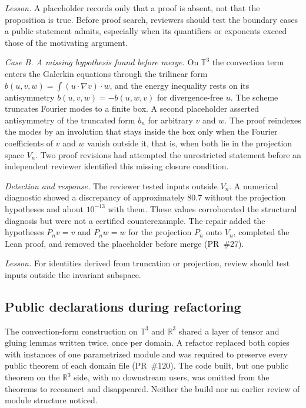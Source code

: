 \emph{Lesson.}
A placeholder records only that a proof is absent, not that the
proposition is true. Before proof search, reviewers should test the
boundary cases a public statement admits, especially when its quantifiers
or exponents exceed those of the motivating argument.

\emph{Case B. A missing hypothesis found before merge.}
On $\mathbb{T}^3$ the convection term enters the Galerkin equations
through the trilinear form $b(u,v,w) = \int (u\cdot\nabla v)\cdot w$, and
the energy inequality rests on its antisymmetry $b(u,v,w) = -b(u,w,v)$ for
divergence-free $u$. The scheme truncates Fourier modes to a finite box. A
second placeholder asserted antisymmetry of the truncated form $b_n$ for
arbitrary $v$ and $w$. The proof reindexes the
modes by an involution that stays inside the box only when the Fourier
coefficients of $v$ and $w$ vanish outside it, that is, when both lie in
the projection space $V_n$. Two proof revisions had attempted the
unrestricted statement before an independent reviewer identified this
missing closure condition. %

\emph{Detection and response.}
The reviewer tested inputs outside $V_n$. A numerical diagnostic showed a
discrepancy of approximately $80.7$ without the projection hypotheses and
about $10^{-13}$ with them. These values corroborated the structural
diagnosis but were not a certified counterexample. The repair added the hypotheses $P_n v = v$
and $P_n w = w$ for the projection $P_n$ onto $V_n$, completed the Lean
proof, and removed the placeholder before merge (PR~\#27).

\emph{Lesson.}
For identities derived from truncation or projection, review should test
inputs outside the invariant subspace. %

\subsection{Public declarations during refactoring}

The convection-form construction on $\mathbb{T}^3$ and $\mathbb{R}^3$
shared a layer of tensor and gluing lemmas written twice, once per domain.
A refactor replaced both copies with instances of one parametrized module
and was required to preserve every public theorem of each domain file
(PR~\#120). The code built, but one public theorem on the $\mathbb{R}^3$
side, with no downstream users, was omitted from the theorems to reconnect
and disappeared. Neither the build nor an earlier review of module
structure noticed. %

